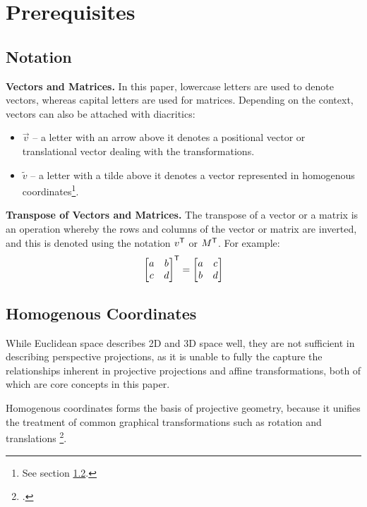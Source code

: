 \section{Prerequisites}

\subsection{Notation}
\noindent\textbf{Vectors and Matrices.} In this paper, lowercase letters are used to denote vectors, whereas capital letters are used for matrices. Depending on the context, vectors can also be attached with diacritics:
\begin{itemize}[leftmargin=!, itemindent=-4ex]
    \item \textbf{$\vec{v}$} -- a letter with an arrow above it denotes a positional vector or translational vector dealing with the transformations.
    \item \textbf{$\widetilde{v}$} -- a letter with a tilde above it denotes a vector represented in homogenous coordinates\footnote{See section \ref{sec:homogenous}.}.
\end{itemize}

\noindent\textbf{Transpose of Vectors and Matrices.} The transpose of a vector or a matrix is an operation whereby the rows and columns of the vector or matrix are inverted, and this is denoted using the notation $v^{\mathsf{T}}$ or $M^{\mathsf{T}}$. For example:
\[
    \begin{bmatrix}
        a & b \\
        c & d
    \end{bmatrix}^{\mathsf{T}}
    =
    \begin{bmatrix}
        a & c \\
        b & d
    \end{bmatrix}
\]

\subsection{Homogenous Coordinates} \label{sec:homogenous}

While Euclidean space describes 2D and 3D space well, they are not sufficient in describing perspective projections, as it is unable to fully the capture the relationships inherent in projective projections and affine transformations, both of which are core concepts in this paper. 

Homogenous coordinates forms the basis of projective geometry, because it unifies the treatment of common graphical transformations such as rotation and translations \footcite[][1]{bloomenthalHomogeneousCoordinates1994}. 

